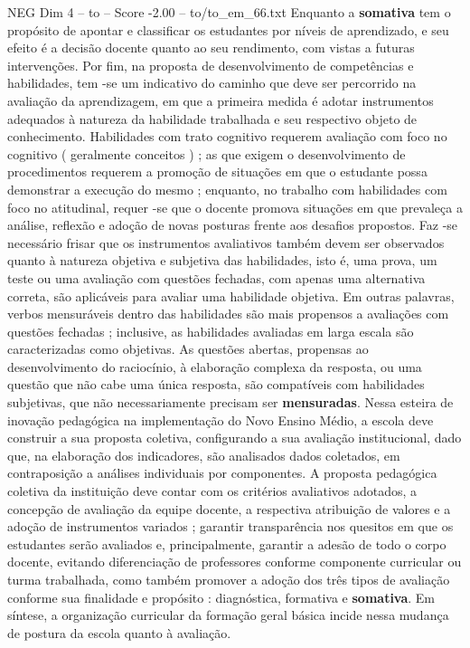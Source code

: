\begin{textsample}{NEG Dim 4 – to – Score -2.00 – to/to\_em\_66.txt}
Enquanto a \textbf{somativa} tem o propósito de apontar e classificar os estudantes por níveis de aprendizado, e seu efeito é a decisão docente quanto ao seu rendimento, com vistas a futuras intervenções.
Por fim, na proposta de desenvolvimento de competências e habilidades, tem -se um indicativo do caminho que deve ser percorrido na avaliação da aprendizagem, em que a primeira medida é adotar instrumentos adequados à natureza da habilidade trabalhada e seu respectivo objeto de conhecimento.
Habilidades com trato cognitivo requerem avaliação com foco no cognitivo ( geralmente conceitos ) ; as que exigem o desenvolvimento de procedimentos requerem a promoção de situações em que o estudante possa demonstrar a execução do mesmo ; enquanto, no trabalho com habilidades com foco no atitudinal, requer -se que o docente promova situações em que prevaleça a análise, reflexão e adoção de novas posturas frente aos desafios propostos.
Faz -se necessário frisar que os instrumentos avaliativos também devem ser observados quanto à natureza objetiva e subjetiva das habilidades, isto é, uma prova, um teste ou uma avaliação com questões fechadas, com apenas uma alternativa correta, são aplicáveis para avaliar uma habilidade objetiva.
Em outras palavras, verbos mensuráveis dentro das habilidades são mais propensos a avaliações com questões fechadas ; inclusive, as habilidades avaliadas em larga escala são caracterizadas como objetivas.
As questões abertas, propensas ao desenvolvimento do raciocínio, à elaboração complexa da resposta, ou uma questão que não cabe uma única resposta, são compatíveis com habilidades subjetivas, que não necessariamente precisam ser \textbf{mensuradas}.
Nessa esteira de inovação pedagógica na implementação do Novo Ensino Médio, a escola deve construir a sua proposta coletiva, configurando a sua avaliação institucional, dado que, na elaboração dos indicadores, são analisados dados coletados, em contraposição a análises individuais por componentes.
A proposta pedagógica coletiva da instituição deve contar com os critérios avaliativos adotados, a concepção de avaliação da equipe docente, a respectiva atribuição de valores e a adoção de instrumentos variados ; garantir transparência nos quesitos em que os estudantes serão avaliados e, principalmente, garantir a adesão de todo o corpo docente, evitando diferenciação de professores conforme componente curricular ou turma trabalhada, como também promover a adoção dos três tipos de avaliação conforme sua finalidade e propósito : diagnóstica, formativa e \textbf{somativa}.
Em síntese, a organização curricular da formação geral básica incide nessa mudança de postura da escola quanto à avaliação.

\end{textsample}
